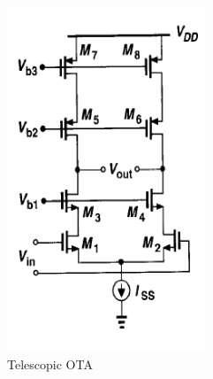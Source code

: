 \begin{figure}
\begin{minipage}[c]{0.35\linewidth}
\includegraphics[width=\linewidth]{images/telescopic.png}
\caption{Telescopic OTA}
\label{tele}
\end{minipage}
\hfill
\begin{minipage}[c]{0.5\linewidth}%

\end{minipage}
\end{figure}
